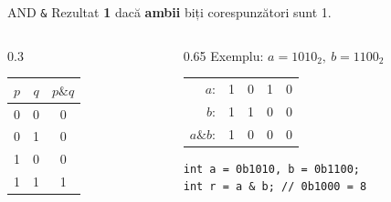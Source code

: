 \documentclass{beamer}
\begin{document}
\begin{frame}[fragile]{AND \textemdash{} \texttt{\&}}
  Rezultat \textbf{1} dacă \textbf{ambii} biți corespunzători sunt 1.
  \bigskip
  \begin{columns}[T]
    \begin{column}{0.3\textwidth}
      \begin{center}
      \begin{tabular}{ccc}
        \toprule
        $p$ & $q$ & $p \mathbin{\&} q$ \\
        \midrule
        0 & 0 & 0 \\
        0 & 1 & 0 \\
        1 & 0 & 0 \\
        1 & 1 & 1 \\
        \bottomrule
      \end{tabular}
      \end{center}
    \end{column}
    \begin{column}{0.65\textwidth}
      Exemplu: $a = 1010_2,\ b = 1100_2$
      \begin{center}
      \begin{tabular}{rcccc}
        $a$:            & 1 & 0 & 1 & 0 \\
        $b$:            & 1 & 1 & 0 & 0 \\
        \hline
        $a \mathbin{\&} b$: & 1 & 0 & 0 & 0 \\
      \end{tabular}
      \end{center}
      \begin{center}
      \begin{lstlisting}
int a = 0b1010, b = 0b1100;
int r = a & b; // 0b1000 = 8
      \end{lstlisting}
      \end{center}
    \end{column}
  \end{columns}
\end{frame}
\end{document}
